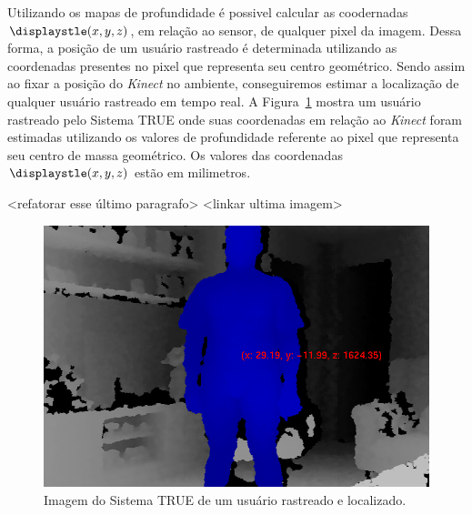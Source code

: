	Utilizando os mapas de profundidade é possivel calcular as coodernadas
	$\displaystle (x,y,z)$, em relação ao sensor, de qualquer pixel da imagem.
	Dessa forma, a posição de um usuário rastreado é determinada utilizando as
	coordenadas presentes no pixel que representa seu centro geométrico. Sendo
	assim ao fixar a posição do \textit{Kinect} no ambiente, conseguiremos estimar
	a localização de qualquer usuário rastreado em tempo real. A
	Figura~\ref{fig:localizacao} mostra um usuário rastreado pelo Sistema TRUE
	onde suas coordenadas em relação ao \textit{Kinect} foram estimadas utilizando
	os valores de profundidade referente ao pixel que representa seu centro de
	massa geométrico. Os valores das coordenadas $\displaystle (x,y,z)$ estão em
	milimetros.
	
	<refatorar esse último paragrafo>
	<linkar ultima imagem>

	\begin{figure}[H]
		\begin{center}
			\includegraphics[scale=0.45]{figuras/4.ProblemaEProposta/localizacao.png}
		\end{center}
		\caption{Imagem do Sistema TRUE de um usuário rastreado e localizado.}
		\label{fig:localizacao}
	\end{figure}
	
